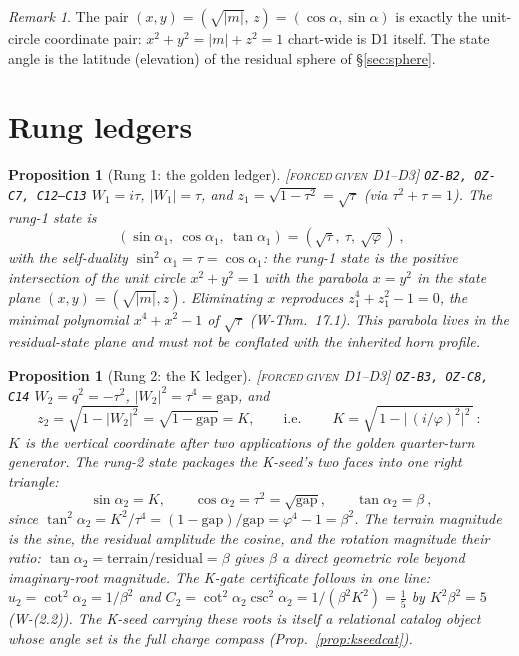 \documentclass[11pt]{article}
\newcommand{\tagFD}{\textcolor{cF}{\textsc{[forced}}\,\textcolor{cD}{\textsc{given D1--D3]}}}
\newcommand{\hx}[1]{\textcolor{cC}{\footnotesize\texttt{#1}}}
\newcommand{\gp}{\varphi}
\newcommand{\gapc}{\mathrm{gap}}
\theoremstyle{plain}
\newtheorem{proposition}[theorem]{Proposition}
\theoremstyle{definition}
\theoremstyle{remark}
\newtheorem{remark}[theorem]{Remark}
\begin{document}
\begin{remark}
The pair $(x,y)=(\sqrt{|m|},\,z)=(\cos\alpha,\sin\alpha)$ is exactly the
unit-circle coordinate pair: $x^2+y^2=|m|+z^2=1$ chart-wide is D1 itself.
The state angle is the latitude (elevation) of the residual sphere of
\S\ref{sec:sphere}.
\end{remark}

\section{Rung ledgers}\label{sec:ledgers}

\begin{proposition}[Rung 1: the golden ledger]\label{prop:rung1}\tagFD{} \hx{OZ-B2, OZ-C7, C12--C13}
$W_1=i\tau$, $|W_1|=\tau$, and $z_1=\sqrt{1-\tau^2}=\sqrt\tau$ (via
$\tau^2+\tau=1$). The rung-1 state is
\[
\boxed{\ (\sin\alpha_1,\ \cos\alpha_1,\ \tan\alpha_1)=(\sqrt\tau,\ \tau,\ \sqrt\gp)\ },
\]
with the self-duality $\sin^2\alpha_1=\tau=\cos\alpha_1$: the rung-1 state is the
positive intersection of the unit circle $x^2+y^2=1$ with the parabola $x=y^2$ in
the state plane $(x,y)=(\sqrt{|m|},z)$. Eliminating $x$ reproduces
$z_1^4+z_1^2-1=0$, the minimal polynomial $x^4+x^2-1$ of $\sqrt\tau$
(W-Thm.\ 17.1). This parabola lives in the residual-state plane and must not be
conflated with the inherited horn profile.
\end{proposition}

\begin{proposition}[Rung 2: the K ledger]\label{prop:rung2}\tagFD{} \hx{OZ-B3, OZ-C8, C14}
$W_2=q^2=-\tau^2$, $|W_2|^2=\tau^4=\gapc$, and
\[
z_2=\sqrt{1-|W_2|^2}=\sqrt{1-\gapc}=K,
\qquad\text{i.e.}\qquad
\boxed{\ K=\sqrt{\,1-\bigl|\,(i/\gp)^2\bigr|^2\,}\ }:
\]
$K$ is the vertical coordinate after two applications of the golden quarter-turn
generator. The rung-2 state packages the K-seed's two faces into one right
triangle:
\[
\boxed{\ \sin\alpha_2=K,\qquad \cos\alpha_2=\tau^2=\sqrt{\gapc},\qquad
\tan\alpha_2=\beta\ },
\]
since $\tan^2\alpha_2=K^2/\tau^4=(1-\gapc)/\gapc=\gp^4-1=\beta^2$. The terrain
magnitude is the sine, the residual amplitude the cosine, and the rotation
magnitude their ratio: $\tan\alpha_2=\text{terrain}/\text{residual}=\beta$ gives
$\beta$ a direct geometric role beyond imaginary-root magnitude. The K-gate
certificate follows in one line:
$u_2=\cot^2\alpha_2=1/\beta^2$ and
$C_2=\cot^2\alpha_2\csc^2\alpha_2=1/(\beta^2K^2)=\tfrac15$ by $K^2\beta^2=5$
(W-(2.2)). The K-seed carrying these roots is itself a relational catalog
object whose angle set is the full charge compass
(Prop.~\ref{prop:kseedcat}).
\end{proposition}
\end{document}
